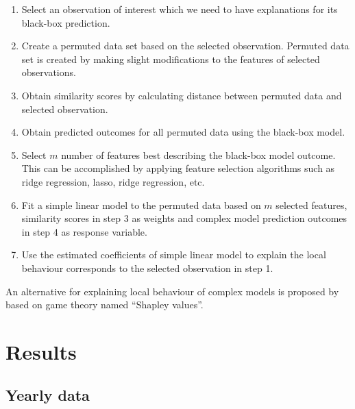 \documentclass[11pt,a4paper,]{article}
\providecommand{\tightlist}{%
  \setlength{\itemsep}{0pt}\setlength{\parskip}{0pt}}
\begin{document}
\begin{enumerate}
\def\labelenumi{\arabic{enumi}.}
\tightlist
\item
  Select an observation of interest which we need to have explanations
  for its black-box prediction.
\item
  Create a permuted data set based on the selected observation. Permuted
  data set is created by making slight modifications to the features of
  selected observations.
\item
  Obtain similarity scores by calculating distance between permuted data
  and selected observation.
\item
  Obtain predicted outcomes for all permuted data using the black-box
  model.
\item
  Select \(m\) number of features best describing the black-box model
  outcome. This can be accomplished by applying feature selection
  algorithms such as ridge regression, lasso, ridge regression, etc.
\item
  Fit a simple linear model to the permuted data based on \(m\) selected
  features, similarity scores in step 3 as weights and complex model
  prediction outcomes in step 4 as response variable.
\item
  Use the estimated coefficients of simple linear model to explain the
  local behaviour corresponds to the selected observation in step 1.
\end{enumerate}

An alternative for explaining local behaviour of complex models is
proposed by \textcite{lundberg2017unified} based on game theory named
``Shapley values''.

\newpage

\section{Results}\label{results}

\subsection{Yearly data}\label{yearly-data}
\end{document}
